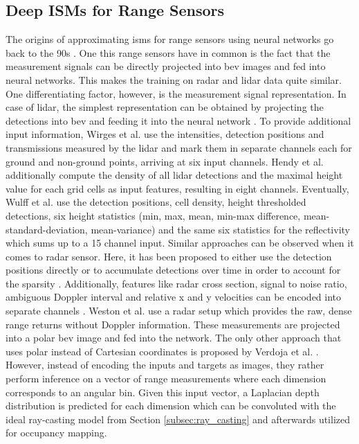 \subsection{Deep ISMs for Range Sensors}
\label{subsec:deep_ism_range}
The origins of approximating \gls{ism}s for range sensors using neural networks go back to the 90s \cite{van1995neural,thrun1993exploration}. One this range sensors have in common is the fact that the measurement signals can be directly projected into \gls{bev} images and fed into neural networks. This makes the training on radar and lidar data quite similar. One differentiating factor, however, is the measurement signal representation. In case of lidar, the simplest representation can be obtained by projecting the detections into \gls{bev} and feeding it into the neural network \cite{liang2018deep}. To provide additional input information, Wirges et al. \cite{wirges2018evidential} use the intensities, detection positions and transmissions measured by the lidar and mark them in separate channels each for ground and non-ground points, arriving at six input channels. Hendy et al. \cite{hendy2020fishing} additionally compute the density of all lidar detections and the maximal height value for each grid cells as input features, resulting in eight channels. Eventually, Wulff et al. \cite{wulff2018early} use the detection positions, cell density, height thresholded detections, six height statistics (min, max, mean, min-max difference, mean-standard-deviation, mean-variance) and the same six statistics for the reflectivity which sums up to a 15 channel input. Similar approaches can be observed when it comes to radar sensor. Here, it has been proposed to either use the detection positions directly \cite{sless2019road} or to accumulate detections over time in order to account for the sparsity \cite{prophet2019semantic,lombacher2017semantic}. Additionally, features like radar cross section, signal to noise ratio, ambiguous Doppler interval and relative x and y velocities can be encoded into separate channels \cite{hendy2020fishing}. Weston et al. \cite{weston2019probably} use a radar setup which provides the raw, dense range returns without Doppler information. These measurements are projected into a polar \gls{bev} image and fed into the network. The only other approach that uses polar instead of Cartesian coordinates is proposed by Verdoja et al. \cite{verdoja2019deep}. However, instead of encoding the inputs and targets as images, they rather perform inference on a vector of range measurements where each dimension corresponds to an angular bin. Given this input vector, a Laplacian depth distribution is predicted for each dimension which can be convoluted with the ideal ray-casting model from Section \ref{subsec:ray_casting} and afterwards utilized for occupancy mapping.
%
